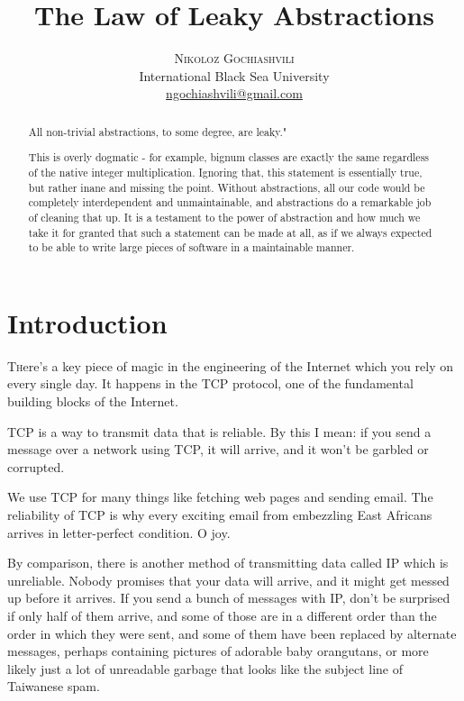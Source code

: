 \documentclass{article}
\title{\vspace{-15mm}%
	\fontsize{24pt}{10pt}\selectfont
	\textbf{The Law of Leaky Abstractions}
	}
\author{%
	\large
	\textsc{Nikoloz Gochiashvili} \\[2mm]
	\normalsize	International Black Sea University \\
	\normalsize	\href{mailto:ngochiashvili@gmail.com}{ngochiashvili@gmail.com}
	\vspace{-5mm}
	}
\date{}
\begin{document}
\maketitle
\thispagestyle{fancy}

\begin{abstract}
\noindent

\cite{JoelonAPIApology}All non-trivial abstractions, to some degree, are leaky."

This is overly dogmatic - for example, bignum classes are exactly the same regardless of the native integer multiplication. Ignoring that, this statement is essentially true, but rather inane and missing the point. Without abstractions, all our code would be completely interdependent and unmaintainable, and abstractions do a remarkable job of cleaning that up. It is a testament to the power of abstraction and how much we take it for granted that such a statement can be made at all, as if we always expected to be able to write large pieces of software in a maintainable manner.
\end{abstract}
	
\section{Introduction}

\lettrine[nindent=0em,lines=3]{T}here's a key piece of magic in the engineering of the Internet which you rely on every single day. It happens in the TCP protocol, one of the fundamental building blocks of the Internet.

TCP is a way to transmit data that is reliable. By this I mean: if you send a message over a network using TCP, it will arrive, and it won't be garbled or corrupted.

We use TCP for many things like fetching web pages and sending email. The reliability of TCP is why every exciting email from embezzling East Africans arrives in letter-perfect condition. O joy.

By comparison, there is another method of transmitting data called IP which is unreliable. Nobody promises that your data will arrive, and it might get messed up before it arrives. If you send a bunch of messages with IP, don't be surprised if only half of them arrive, and some of those are in a different order than the order in which they were sent, and some of them have been replaced by alternate messages, perhaps containing pictures of adorable baby orangutans, or more likely just a lot of unreadable garbage that looks like the subject line of Taiwanese spam.
\end{document}
